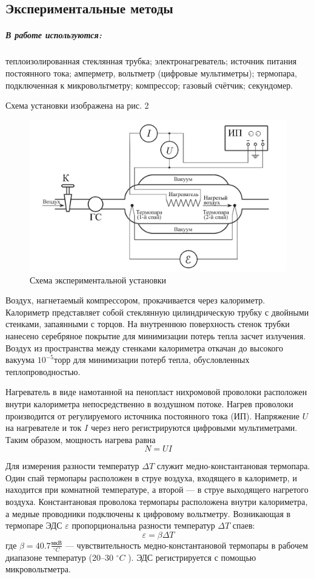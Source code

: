 \documentclass[12pt,a4paper]{article}
\begin{document}
\subsection*{Экспериментальные методы}
\subparagraph*{В работе используются:}теплоизолированная стеклянная трубка; электронагреватель; источник питания постоянного тока; амперметр, вольтметр (цифровые мультиметры); термопара, подключенная к микровольтметру; компрессор; газовый счётчик; секундомер.

Схема установки изображена на рис. 2
\begin{figure}[h!]
    \centering
    \includegraphics[width=0.7\linewidth]{2.png}
    \caption{Схема экспериментальной установки}
    \label{fig:my_label}
\end{figure}

Воздух, нагнетаемый компрессором, прокачивается через калориметр. Калориметр представляет собой стеклянную цилиндрическую трубку с двойными стенками, запаянными с торцов. На внутреннюю поверхность стенок трубки нанесено серебряное покрытие для минимизации потерь тепла засчет излучения. Воздух из пространства между стенками калориметра откачан до высокого вакуума $10^{-5} торр$ для минимизации потерб тепла, обусловленных теплопроводностью.

Нагреватель в виде намотанной на пенопласт нихромовой проволоки расположен внутри калориметра непосредственно в воздушном потоке. Нагрев проволоки производится от регулируемого источника постоянного тока (ИП).
Напряжение $U$ на нагревателе и ток $I$ через него регистрируются цифровыми мультиметрами. Таким образом, мощность нагрева равна
\begin{equation}
    N =UI
\end{equation}

Для измерения разности температур $\Delta T$ служит медно-константановая
термопара. Один спай термопары расположен в струе воздуха, входящего в калориметр, и находится при комнатной температуре, а второй — в струе выходящего нагретого воздуха. Константановая проволока термопары расположена внутри калориметра, а медные проводники подключены к цифровому вольтметру. Возникающая в термопаре ЭДС $\varepsilon$ пропорциональна разности температур $\Delta T$ спаев:
\begin{equation}
    \varepsilon =\beta \Delta T  
\end{equation}
где $\beta = 40.7 \frac{мкВ}{^\circ C}$ — чувствительность медно-константановой термопары в рабочем диапазоне температур (20–30 $^\circ C$ ). ЭДС регистрируется с помощью микровольтметра.
\end{document}
